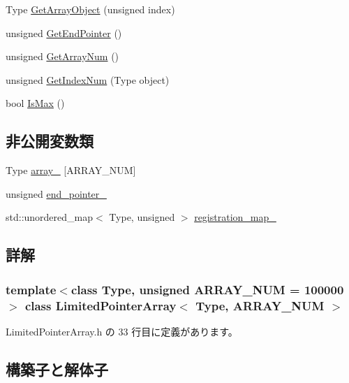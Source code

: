 \begin{DoxyCompactItemize}
\item 
Type \mbox{\hyperlink{class_limited_pointer_array_aae48443929a3766e602eb96f515c3a34}{Get\+Array\+Object}} (unsigned index)
\item 
unsigned \mbox{\hyperlink{class_limited_pointer_array_a4c070b87cde4d2ea173aa28918af6223}{Get\+End\+Pointer}} ()
\item 
unsigned \mbox{\hyperlink{class_limited_pointer_array_a404c188412a49f58ecacabd41c974de2}{Get\+Array\+Num}} ()
\item 
unsigned \mbox{\hyperlink{class_limited_pointer_array_a2b9d42b57662f29f357b2faf1793aa66}{Get\+Index\+Num}} (Type object)
\item 
bool \mbox{\hyperlink{class_limited_pointer_array_a8bd3a7ea969f307c35934a1bf2803b40}{Is\+Max}} ()
\end{DoxyCompactItemize}
\subsection*{非公開変数類}
\begin{DoxyCompactItemize}
\item 
Type \mbox{\hyperlink{class_limited_pointer_array_a80e958d7818fc6ee0e757b56abc937a4}{array\+\_\+}} \mbox{[}A\+R\+R\+A\+Y\+\_\+\+N\+UM\mbox{]}
\item 
unsigned \mbox{\hyperlink{class_limited_pointer_array_a7da38a8f2ea9a4b030f64f0e8adc27e8}{end\+\_\+pointer\+\_\+}}
\item 
std\+::unordered\+\_\+map$<$ Type, unsigned $>$ \mbox{\hyperlink{class_limited_pointer_array_a4f3ca120f5fc23ee3db798cb701d61a0}{registration\+\_\+map\+\_\+}}
\end{DoxyCompactItemize}


\subsection{詳解}
\subsubsection*{template$<$class Type, unsigned A\+R\+R\+A\+Y\+\_\+\+N\+UM = 100000$>$\newline
class Limited\+Pointer\+Array$<$ Type, A\+R\+R\+A\+Y\+\_\+\+N\+U\+M $>$}



 Limited\+Pointer\+Array.\+h の 33 行目に定義があります。



\subsection{構築子と解体子}
\mbox{\label{class_limited_pointer_array_acab3e47d77fcd7ed7735a735e1aaf8f9}} 
